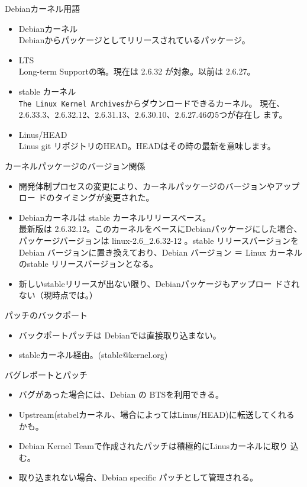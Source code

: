 \begin{frame}[containsverbatim]{Debianカーネル用語}
\begin{itemize}
\item Debianカーネル\\
Debianからパッケージとしてリリースされているパッケージ。
\item LTS \\
Long-term Supportの略。現在は 2.6.32 が対象。以前は 2.6.27。
\item stable カーネル \\
\texttt{The Linux Kernel Archives}からダウンロードできるカーネル。
現在、2.6.33.3、2.6.32.12、2.6.31.13、2.6.30.10、2.6.27.46の5つが存在し
ます。
\item Linus/HEAD \\
Linus git リポジトリのHEAD。HEADはその時の最新を意味します。
\end{itemize}
\end{frame}

\begin{frame}[containsverbatim]{カーネルパッケージのバージョン関係}

\begin{itemize}
\item 開発体制プロセスの変更により、カーネルパッケージのバージョンやアップロー
ドのタイミングが変更された。
\item Debianカーネルは stable カーネルリリースベース。\\
最新版は 2.6.32.12。このカーネルをベースにDebianパッケージにした場合、パッケージバージョンは
linux-2.6\_2.6.32-12 。stable リリースバージョンをDebian
バージョンに置き換えており、Debian バージョン ＝ Linux カーネルのstable
リリースバージョンとなる。
\item 新しいstableリリースが出ない限り、Debianパッケージもアップロー
ドされない（現時点では。）
\end{itemize}
\end{frame}


\begin{frame}[containsverbatim]{パッチのバックポート}
\begin{itemize}
\item バックポートパッチは Debianでは直接取り込まない。
\item stableカーネル経由。(stable@kernel.org)
\end{itemize}
\end{frame}

\begin{frame}[containsverbatim]{バグレポートとパッチ}
\begin{itemize}
\item バグがあった場合には、Debian の BTSを利用できる。
\item Upstream(stabelカーネル、場合によってはLinus/HEAD)に転送してくれる
      かも。
\item Debian Kernel Teamで作成されたパッチは積極的にLinusカーネルに取り
      込む。
\item 取り込まれない場合、Debian specific パッチとして管理される。
\end{itemize}
\end{frame}

